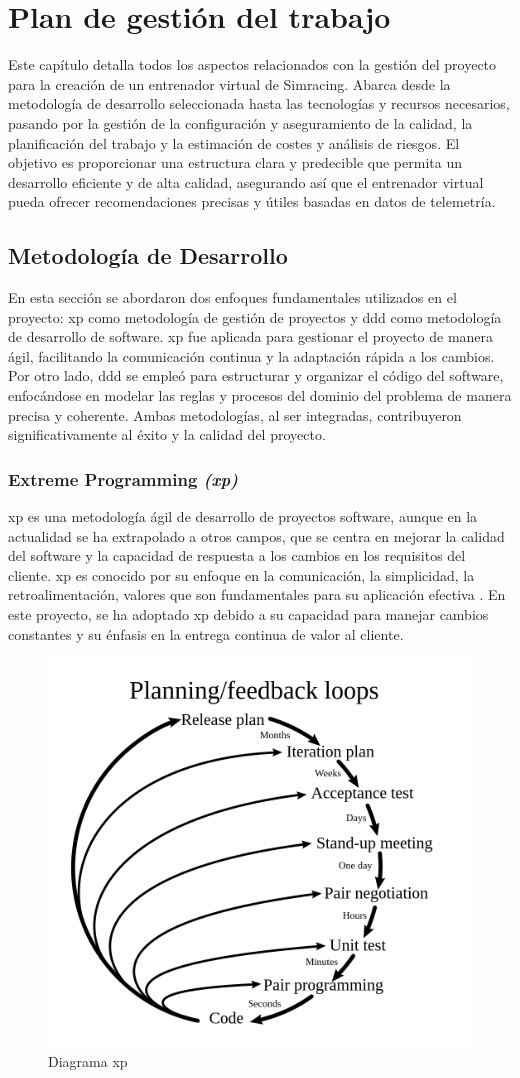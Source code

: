 \chapter{Plan de gestión del trabajo}\label{cap:Planificacion}
Este capítulo detalla todos los aspectos relacionados con la gestión del proyecto para la creación de un entrenador virtual de Simracing. Abarca desde la metodología de desarrollo seleccionada hasta las tecnologías y recursos necesarios, pasando por la gestión de la configuración y aseguramiento de la calidad, la planificación del trabajo y la estimación de costes y análisis de riesgos. El objetivo es proporcionar una estructura clara y predecible que permita un desarrollo eficiente y de alta calidad, asegurando así que el entrenador virtual pueda ofrecer recomendaciones precisas y útiles basadas en datos de telemetría.


\section{Metodología de Desarrollo}
En esta sección se abordaron dos enfoques fundamentales utilizados en el proyecto: \ac{xp} como metodología de gestión de proyectos y \ac{ddd} como metodología de desarrollo de software. \ac{xp} fue aplicada para gestionar el proyecto de manera ágil, facilitando la comunicación continua y la adaptación rápida a los cambios. Por otro lado, \ac{ddd} se empleó para estructurar y organizar el código del software, enfocándose en modelar las reglas y procesos del dominio del problema de manera precisa y coherente. Ambas metodologías, al ser integradas, contribuyeron significativamente al éxito y la calidad del proyecto.


\subsection{Extreme Programming \textit{(\ac{xp})}}
\ac{xp} es una metodología ágil de desarrollo de proyectos software, aunque en la actualidad se ha extrapolado a otros campos, que se centra en mejorar la calidad del software y la capacidad de respuesta a los cambios en los requisitos del cliente. \ac{xp} es conocido por su enfoque en la comunicación, la simplicidad, la retroalimentación, valores que son fundamentales para su aplicación efectiva \cite{Beck2004}. En este proyecto, se ha adoptado \ac{xp} debido a su capacidad para manejar cambios constantes y su énfasis en la entrega continua de valor al cliente.

\begin{figure}[H]
	\centering
	\includegraphics[width=0.4\linewidth]{./figs/herramientas/desarrollo/extreme_programming.png}
	\caption[Diagrama \ac{xp}]{Diagrama \ac{xp} \cite{xp_wiki}}
\end{figure}

